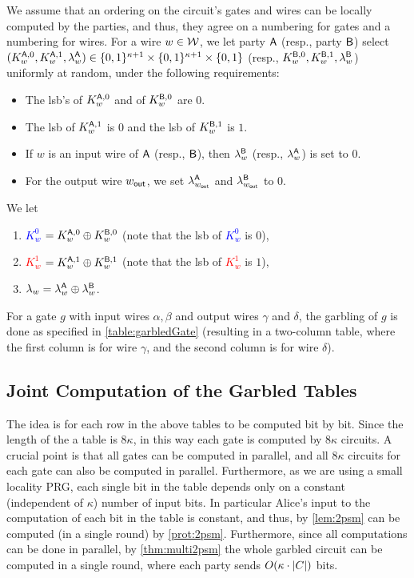 We assume that an ordering on the circuit's gates and wires can be locally computed by the parties, and thus, they agree on a numbering for gates and a numbering for wires. For a wire $w\in{\cal W}$, we let party $\mathsf{A}$ (resp., party $\mathsf{B}$) select $(K_w^{\mathsf{A},0},K_w^{\mathsf{A},1},\lambda_{w}^{\mathsf{A}}) \in \{0,1\}^{\kappa+1}\times\{0,1\}^{\kappa+1}\times\{0,1\}$ (resp., $K_w^{\mathsf{B},0},K_w^{\mathsf{B},1},\lambda_{w}^{\mathsf{B}}$) uniformly at random, under the following requirements:
\begin{itemize}
    \item The lsb's of $K_w^{\mathsf{A},0}$ and of  $K_w^{\mathsf{B},0}$ are $0$.
    \item The lsb of $K_w^{\mathsf{A},1}$ is $0$ and the lsb of $K_w^{\mathsf{B},1}$ is $1$.
    \item If $w$ is an input wire of $\mathsf{A}$ (resp., $\mathsf{B}$), then $\lambda_{w}^{\mathsf{B}}$ (resp., $\lambda_{w}^{\mathsf{A}}$) is set to $0$. 
    \item For the output wire $w_{\mathsf{out}}$, we set $\lambda_{w_{\mathsf{out}}}^{\mathsf{A}}$ and $\lambda_{w_{\mathsf{out}}}^{\mathsf{B}}$ to $0$.
\end{itemize}
We let 
\begin{enumerate}
    \item \textcolor{blue}{$K_w^{0}$} $= K_w^{\mathsf{A},0}\oplus K_w^{\mathsf{B},0}$ (note that the lsb of \textcolor{blue}{$K_w^{0}$} is $0$),
    \item \textcolor{red}{$K_w^{1}$} $= K_w^{\mathsf{A},1}\oplus K_w^{\mathsf{B},1}$  (note that the lsb of \textcolor{red}{$K_w^{1}$} is $1$),
    \item $\lambda_w = \lambda_{w}^{\mathsf{A}}\oplus \lambda_{w}^{\mathsf{B}}$.
\end{enumerate}
 For a gate $g$ with input wires  $\alpha,\beta$ and output wires  $\gamma$ and $\delta$, the garbling of $g$ is done as specified in  \cref{table:garbledGate} (resulting in a two-column table, where the first column is for wire $\gamma$, and the second column is for wire $\delta$).





\subsection{Joint Computation of the Garbled Tables}
The idea is for each row in the above tables to be computed bit by bit. Since the length of the a table is $8\kappa$, in this way each gate is computed by $8\kappa$ circuits. A crucial point is that all gates can be computed in parallel, and all $8\kappa$ circuits for each gate can also be computed in parallel. Furthermore, as we are using a small locality PRG, each single bit in the table depends only on a constant (independent of $\kappa$) number of input bits.     In particular Alice's input to the computation of each bit in the table is constant, and thus, by \cref{lem:2psm} can be computed (in a single round) by \cref{prot:2psm}.  Furthermore, since all computations can be done in parallel, by \cref{thm:multi2psm} the whole garbled circuit can be computed in a single round, where each party sends $O(\kappa\cdot\left|C\right|)$ bits.

